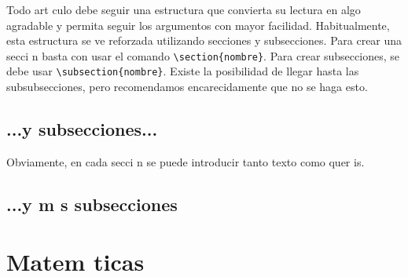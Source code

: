 \documentclass{article}
\begin{document}
Todo art culo debe seguir una estructura que convierta su lectura en algo agradable y permita seguir los argumentos con mayor facilidad.
Habitualmente, esta estructura se ve reforzada utilizando secciones y subsecciones.
Para crear una secci n basta con usar el comando \verb+\section{nombre}+.
Para crear subsecciones, se debe usar \verb+\subsection{nombre}+.
Existe la posibilidad de llegar hasta las subsubsecciones, pero recomendamos encarecidamente que no se haga esto.

\subsection{...y subsecciones...}

Obviamente, en cada secci n se puede introducir tanto texto como quer is.

\subsection{...y m s subsecciones}

\section{Matem ticas}
\end{document}
